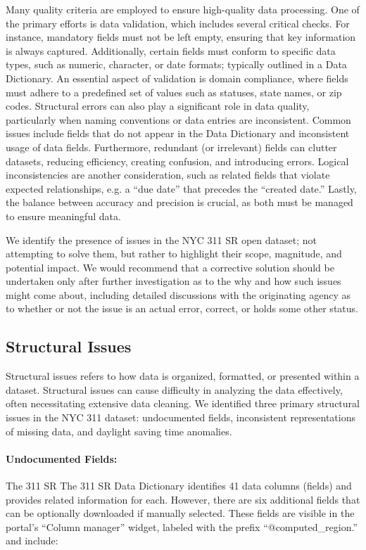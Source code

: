 \documentclass[linenumber]{jdsart}
\begin{document}
Many quality criteria are employed to ensure high-quality data 
processing. One of the primary efforts is data validation, which includes 
several critical checks. For instance, mandatory fields must not be 
left empty, ensuring that key information is always captured. 
Additionally, certain fields must conform to specific data types, 
such as numeric, character, or date formats; typically 
outlined in a Data Dictionary. An essential aspect of 
validation is domain compliance, where 
fields must adhere to a predefined set of 
values such as statuses, state names, or zip codes. Structural 
errors can also play a significant role in data quality, particularly when 
naming conventions or data entries are inconsistent. Common issues 
include fields that do not appear in the Data Dictionary and  
inconsistent usage of data fields. Furthermore, redundant 
(or irrelevant) fields can clutter datasets, reducing efficiency, 
creating confusion, and introducing errors. Logical inconsistencies 
are another consideration, such as related fields that violate expected 
relationships, e.g. a ``due date'' that precedes the ``created date.'' 
Lastly, the balance between accuracy and precision is crucial, as both 
must be managed to ensure meaningful data.


We identify the presence of issues in the NYC 311 SR open dataset;
not attempting to solve them, but rather to highlight their scope, 
magnitude, and potential impact. We would recommend 
that a corrective solution should be undertaken only 
after further investigation as to the why and how such 
issues might come about, including  detailed discussions 
with the originating agency as to whether or not the issue is an 
actual error, correct,  or holds some other status.


\subsection{Structural Issues}
\label{sec:structural}
Structural issues refers to how data is organized, formatted, 
or presented within a dataset. Structural issues can cause difficulty in 
analyzing the data effectively, often necessitating extensive 
data cleaning. We identified three primary structural issues in the
NYC 311 dataset: undocumented fields, inconsistent representations of
missing data, and daylight saving time anomalies.
 
\paragraph{Undocumented Fields:} The 311 SR 
The 311 SR Data Dictionary identifies 
41 data columns (fields) and provides related information 
for each. However, there are six additional fields that can be
optionally downloaded if manually selected. These fields are 
visible in the portal's ``Column manager'' widget, labeled with the prefix 
``@computed\_region.'' and include:
\end{document}
